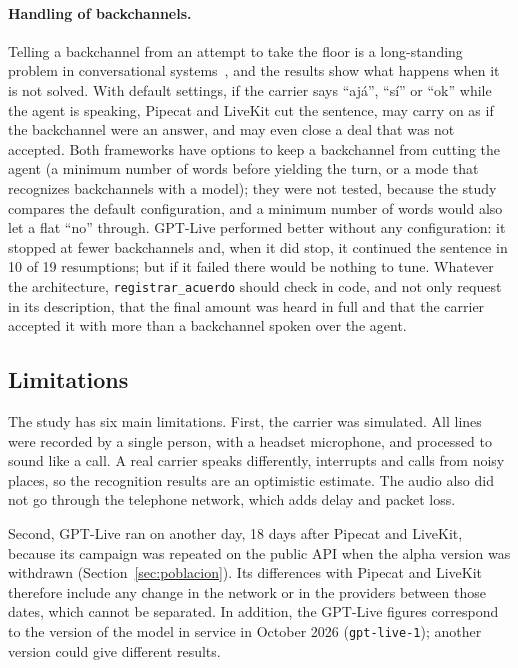 \documentclass[11pt]{article}
\newcommand{\RIntRetCC}{10}
\newcommand{\RIntRetTotalC}{19}
\begin{document}
\paragraph{Handling of backchannels.} Telling a backchannel from an attempt to take the floor is a long-standing problem in conversational systems~\cite{skantze2021,ekstedt2022vap}, and the results show what happens when it is not solved. With default settings, if the
carrier says ``ajá'', ``sí'' or ``ok'' while the agent is speaking, Pipecat and
LiveKit cut the sentence, may carry on as if the backchannel were an answer, and may
even close a deal that was not accepted. Both frameworks have options to keep a
backchannel from cutting the agent (a minimum number of words before yielding the turn,
or a mode that recognizes backchannels with a model); they were not tested, because the
study compares the default configuration, and a minimum number of words would also let
a flat ``no'' through. GPT-Live performed better without any configuration: it stopped
at fewer backchannels and, when it did stop, it continued the sentence in \RIntRetCC{}
of \RIntRetTotalC{} resumptions; but if it failed there would be nothing to tune.
Whatever the architecture, \texttt{registrar\_acuerdo} should check in code, and not
only request in its description, that the final amount was heard in full and that the
carrier accepted it with more than a backchannel spoken over the agent.

\subsection{Limitations}\label{sec:limitaciones}

The study has six main limitations.
First, the carrier was simulated.
All lines were recorded by a single person, with a headset microphone, and processed to sound like a call.
A real carrier speaks differently, interrupts and calls from noisy places, so the recognition results are an optimistic estimate.
The audio also did not go through the telephone network, which adds delay and packet loss.

Second, GPT-Live ran on another day, 18 days after Pipecat and LiveKit, because its campaign was repeated on the public API when the alpha version was withdrawn (Section~\ref{sec:poblacion}).
Its differences with Pipecat and LiveKit therefore include any change in the network or in the providers between those dates, which cannot be separated.
In addition, the GPT-Live figures correspond to the version of the model in service in October 2026 (\texttt{gpt-live-1}); another version could give different results.
\end{document}
